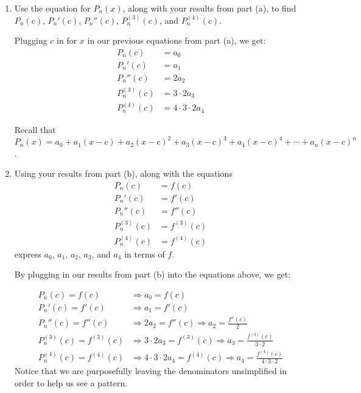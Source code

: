 \documentclass[main]{subfiles}
\begin{document}
\begin{enumerate}
\begin{enumerate}
 

 \pspace{\newpage}

 
 \item 
 \begin{problem}[1in]
 Use the equation for $P_n(x)$, along with your results from part (a), to find $P_n(c)$, $P_n'(c)$, $P_n''(c)$, $P_n^{(3)}(c)$, and $P_n^{(4)}(c)$. 
 \end{problem}
 
 
 \begin{solution}
 Plugging $c$ in for $x$ in our previous equations from part (a), we get:
 \begin{align*}
 P_n(c)&=a_0\\
 P_n'(c)&=a_1\\
 P_n''(c)&=2a_2\\
 P_n^{(3)}(c)&=3\cdot2a_3\\
 P_n^{(4)}(c)&=4\cdot 3\cdot 2a_4
 \end{align*}
 \end{solution}
 
 
  Recall that $P_n(x)=a_0+a_1(x-c)+a_2(x-c)^2+ a_3(x-c)^3+a_4(x-c)^4+\cdots +a_n(x-c)^n$.
 \item 
 \begin{problem}[1.5in]
 Using your results from part (b), along with the equations
   \begin{align*}
  P_n(c) &= f(c)\\
  P_n'(c) &= f'(c)\\
  P_n''(c) &= f''(c)\\
  P_n^{(3)}(c)&=f^{(3)}(c)\\
  P_n^{(4)}(c)&=f^{(4)}(c)
  \end{align*}
  express $a_0$, $a_1$, $a_2$, $a_3$, and $a_4$ in terms of $f$. 
 \end{problem}
 
 \begin{solution}
 By plugging in our results from part (b) into the equations above, we get:
 
  \begin{align*}
  P_n(c) = f(c) &\Longrightarrow \boxed{a_0=f(c)}\\
  P_n'(c) = f'(c)&\Longrightarrow \boxed{a_1=f'(c)}\\
  P_n''(c) = f''(c)&\Longrightarrow 2a_2=f''(c) \Longrightarrow \boxed{a_2=\frac{f''(c)}{2}}\\
  P_n^{(3)}(c)=f^{(3)}(c) &\Longrightarrow 3\cdot2a_3=f^{(3)}(c) \Longrightarrow \boxed{a_3=\frac{f^{(3)}(c)}{3\cdot 2}}\\
  P_n^{(4)}(c)=f^{(4)}(c) &\Longrightarrow 4\cdot 3\cdot 2a_4=f^{(4)}(c)\Longrightarrow \boxed{a_4=\frac{f^{(4)}(c)}{4\cdot3\cdot 2}}
  \end{align*}
   Notice that we are purposefully leaving the denominators unsimplified in order to help us see a pattern.
 \end{solution}
 

\end{enumerate}
\end{enumerate}
\end{document}
